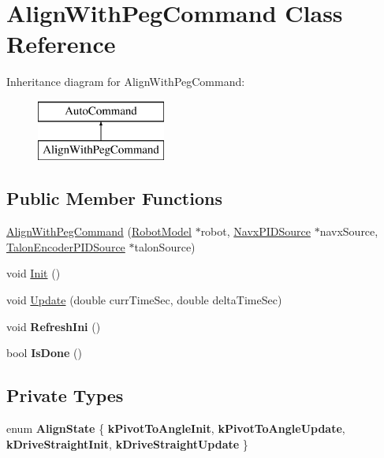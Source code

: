 \hypertarget{class_align_with_peg_command}{}\section{Align\+With\+Peg\+Command Class Reference}
\label{class_align_with_peg_command}
Inheritance diagram for Align\+With\+Peg\+Command\+:\begin{figure}[H]
\begin{center}
\leavevmode
\includegraphics[height=2.000000cm]{class_align_with_peg_command}
\end{center}
\end{figure}
\subsection*{Public Member Functions}
\begin{DoxyCompactItemize}
\item 
\hyperlink{class_align_with_peg_command_aa80f810ce5619a36edaef95cc29c9323}{Align\+With\+Peg\+Command} (\hyperlink{class_robot_model}{Robot\+Model} $\ast$robot, \hyperlink{class_navx_p_i_d_source}{Navx\+P\+I\+D\+Source} $\ast$navx\+Source, \hyperlink{class_talon_encoder_p_i_d_source}{Talon\+Encoder\+P\+I\+D\+Source} $\ast$talon\+Source)
\item 
void \hyperlink{class_align_with_peg_command_aec3a26a2f33ac872b551f8ae0e69016e}{Init} ()
\item 
void \hyperlink{class_align_with_peg_command_a718e94b95fb192cf1e770e8af32dc616}{Update} (double curr\+Time\+Sec, double delta\+Time\+Sec)
\item 
\mbox{\label{class_align_with_peg_command_a6f7b67c385b45154eef57703f242a4b3}} 
void {\bfseries Refresh\+Ini} ()
\item 
\mbox{\label{class_align_with_peg_command_aba9bae73047f3c752ab0e401dcb8eb77}} 
bool {\bfseries Is\+Done} ()
\end{DoxyCompactItemize}
\subsection*{Private Types}
\begin{DoxyCompactItemize}
\item 
\mbox{\label{class_align_with_peg_command_af279cc96527016f0bf95bb965f285f18}} 
enum {\bfseries Align\+State} \{ {\bfseries k\+Pivot\+To\+Angle\+Init}, 
{\bfseries k\+Pivot\+To\+Angle\+Update}, 
{\bfseries k\+Drive\+Straight\+Init}, 
{\bfseries k\+Drive\+Straight\+Update}
 \}
\end{DoxyCompactItemize}
